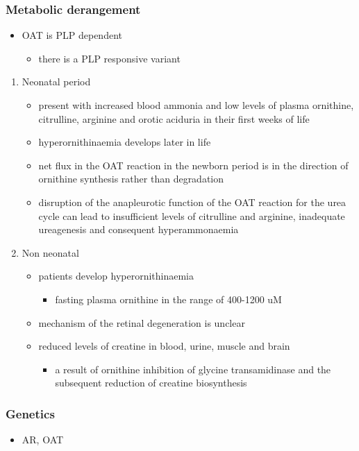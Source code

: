 \documentclass{scrartcl}
\begin{document}
\subsubsection{Metabolic derangement}
\label{sec:org932f292}
\begin{itemize}
\item OAT is PLP dependent
\begin{itemize}
\item there is a PLP responsive variant
\end{itemize}
\end{itemize}
\begin{enumerate}
\item Neonatal period
\label{sec:org451dda2}
\begin{itemize}
\item present with increased blood ammonia and low levels of plasma
ornithine, citrulline, arginine and orotic aciduria in their first
weeks of life
\item hyperornithinaemia develops later in life
\item net flux in the OAT reaction in the newborn period is in the
direction of ornithine synthesis rather than degradation
\item disruption of the anapleurotic function of the OAT reaction for the
urea cycle can lead to insufficient levels of citrulline and
arginine, inadequate ureagenesis and consequent hyperammonaemia
\end{itemize}
\item Non neonatal
\label{sec:orgbdf1973}
\begin{itemize}
\item patients develop hyperornithinaemia
\begin{itemize}
\item fasting plasma ornithine in the range of 400-1200 uM
\end{itemize}
\item mechanism of the retinal degeneration is unclear
\item reduced levels of creatine in blood, urine, muscle and brain
\begin{itemize}
\item a result of ornithine inhibition of glycine transamidinase and the
subsequent reduction of creatine biosynthesis
\end{itemize}
\end{itemize}
\end{enumerate}

\subsubsection{Genetics}
\label{sec:org36dcfb8}
\begin{itemize}
\item AR, OAT
\end{itemize}
\end{document}
